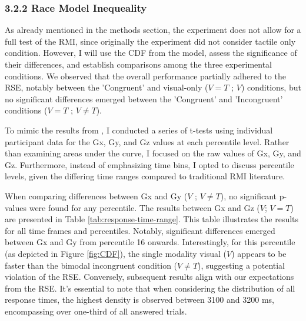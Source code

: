 \documentclass[12pt,oneside,openright]{report}
\begin{document}
\subsubsection*{3.2.2 Race Model Inequeality}

As already mentioned in the methods section, the experiment does not allow for a full test of the RMI, since originally the experiment did not consider tactile only condition. However, I will use the CDF from the model, assess the significance of their differences, and establish comparisons among the three experimental conditions. We observed that the overall performance partially adhered to the RSE, notably between the 'Congruent' and visual-only ($V=T$ ; $V$) conditions, but no significant differences emerged between the 'Congruent' and 'Incongruent' conditions ($V=T$ ; $V \neq T$). 

To mimic the results from \Cite{SALTAFOSSI2023108642}, I conducted a series of t-tests using individual participant data for the Gx, Gy, and Gz values at each percentile level. Rather than examining areas under the curve, I focused on the raw values of Gx, Gy, and Gz. Furthermore, instead of emphasizing time bins, I opted to discuss percentile levels, given the differing time ranges compared to traditional RMI literature. 

When comparing differences between Gx and Gy ($V$ ; $V \neq T$), no significant p-values were found for any percentile. The results between Gx and Gz ($V$; $V=T$) are presented in Table \ref{tab:response-time-range}. This table illustrates the results for all time frames and percentiles. Notably, significant differences emerged between Gx and Gy from percentile 16 onwards. Interestingly, for this percentile (as depicted in Figure \ref{fig:CDF}), the single modality visual ($V$) appears to be faster than the bimodal incongruent condition ($V \neq T$), suggesting a potential violation of the RSE. Conversely, subsequent results align with our expectations from the RSE. It's essential to note that when considering the distribution of all response times, the highest density is observed between 3100 and 3200 ms, encompassing over one-third of all answered trials.
 
\end{document}
